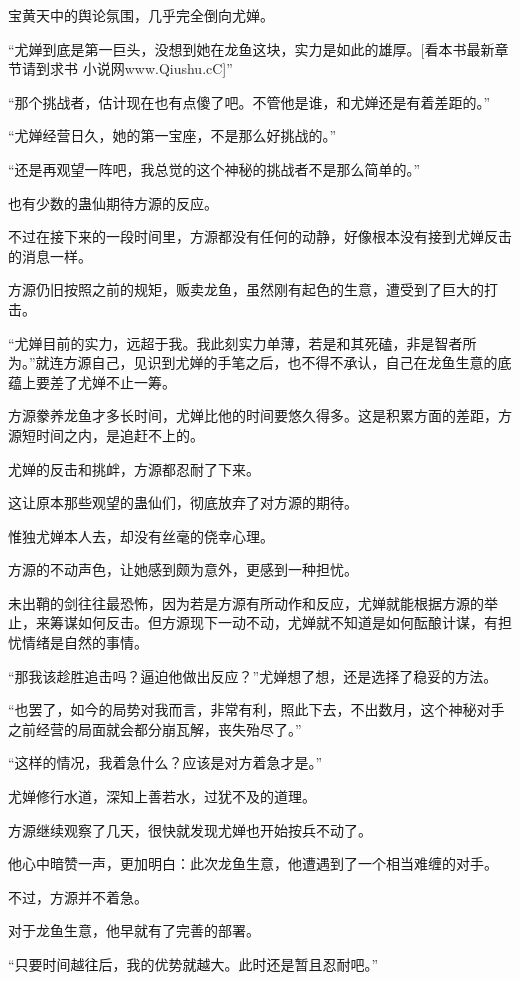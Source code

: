 \begin{this_body}
宝黄天中的舆论氛围，几乎完全倒向尤婵。

“尤婵到底是第一巨头，没想到她在龙鱼这块，实力是如此的雄厚。[看本书最新章节请到求书 小说网www.Qiushu.cC]”

“那个挑战者，估计现在也有点傻了吧。不管他是谁，和尤婵还是有着差距的。”

“尤婵经营日久，她的第一宝座，不是那么好挑战的。”

“还是再观望一阵吧，我总觉的这个神秘的挑战者不是那么简单的。”

也有少数的蛊仙期待方源的反应。

不过在接下来的一段时间里，方源都没有任何的动静，好像根本没有接到尤婵反击的消息一样。

方源仍旧按照之前的规矩，贩卖龙鱼，虽然刚有起色的生意，遭受到了巨大的打击。

“尤婵目前的实力，远超于我。我此刻实力单薄，若是和其死磕，非是智者所为。”就连方源自己，见识到尤婵的手笔之后，也不得不承认，自己在龙鱼生意的底蕴上要差了尤婵不止一筹。

方源豢养龙鱼才多长时间，尤婵比他的时间要悠久得多。这是积累方面的差距，方源短时间之内，是追赶不上的。

尤婵的反击和挑衅，方源都忍耐了下来。

这让原本那些观望的蛊仙们，彻底放弃了对方源的期待。

惟独尤婵本人去，却没有丝毫的侥幸心理。

方源的不动声色，让她感到颇为意外，更感到一种担忧。

未出鞘的剑往往最恐怖，因为若是方源有所动作和反应，尤婵就能根据方源的举止，来筹谋如何反击。但方源现下一动不动，尤婵就不知道是如何酝酿计谋，有担忧情绪是自然的事情。

“那我该趁胜追击吗？逼迫他做出反应？”尤婵想了想，还是选择了稳妥的方法。

“也罢了，如今的局势对我而言，非常有利，照此下去，不出数月，这个神秘对手之前经营的局面就会都分崩瓦解，丧失殆尽了。”

“这样的情况，我着急什么？应该是对方着急才是。”

尤婵修行水道，深知上善若水，过犹不及的道理。

方源继续观察了几天，很快就发现尤婵也开始按兵不动了。

他心中暗赞一声，更加明白：此次龙鱼生意，他遭遇到了一个相当难缠的对手。

不过，方源并不着急。

对于龙鱼生意，他早就有了完善的部署。

“只要时间越往后，我的优势就越大。此时还是暂且忍耐吧。”


\end{this_body}

